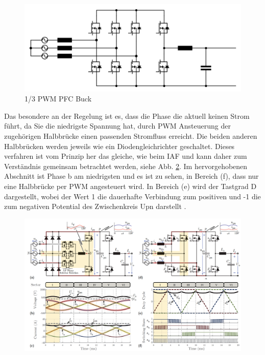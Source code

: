 \begin{figure}
	\centering
	\includegraphics[width=0.9\linewidth]{content/Grafiken/B6_Buck}
	\caption[1/3 PWM PFC Buck]{1/3 PWM PFC Buck}
	\label{fig:b6buck}
\end{figure}

Das besondere an der Regelung ist es, dass die Phase die aktuell keinen Strom führt, da Sie die niedrigste Spannung hat, durch \gls{PWM} Ansteuerung der zugehörigen Halbbrücke einen passenden Stromfluss erreicht. Die beiden anderen Halbbrücken werden jeweils wie ein Diodengleichrichter geschaltet. Dieses verfahren ist vom Prinzip her das gleiche, wie beim \gls{IAF} und kann daher zum Verständnis gemeinsam betrachtet werden, siehe Abb. \ref{fig:b6iafsectors}.
Im hervorgehobenen Abschnitt ist Phase b am niedrigsten und es ist zu sehen, in Bereich (f), dass nur eine Halbbrücke per \gls{PWM} angesteuert wird. In Bereich (e) wird der Tastgrad \gls{D} dargestellt, wobei der Wert 1 die dauerhafte Verbindung zum positiven und -1 die zum negativen Potential des Zwischenkreis \gls{Upn} darstellt \cite{13PWMPFC}.\\ 

\begin{figure}
	\centering
	\includegraphics[width=0.9\linewidth]{content/Grafiken/B6+IAF_Sectors.png}
	\caption[Sektorenaufteilung und Schaltverhalten von IAF und B6 1/3 \cite{13PWMPFC}]{}
	\label{fig:b6iafsectors}
\end{figure}


